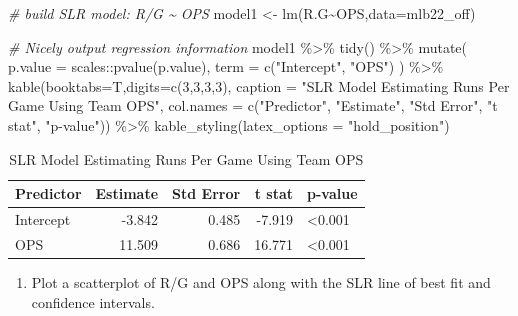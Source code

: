 \documentclass[
  11pt,
]{book}
\newenvironment{Shaded}{\begin{snugshade}}{\end{snugshade}}
\newcommand{\AttributeTok}[1]{\textcolor[rgb]{0.77,0.63,0.00}{#1}}
\newcommand{\CommentTok}[1]{\textcolor[rgb]{0.56,0.35,0.01}{\textit{#1}}}
\newcommand{\DecValTok}[1]{\textcolor[rgb]{0.00,0.00,0.81}{#1}}
\newcommand{\FunctionTok}[1]{\textcolor[rgb]{0.00,0.00,0.00}{#1}}
\newcommand{\NormalTok}[1]{#1}
\newcommand{\OtherTok}[1]{\textcolor[rgb]{0.56,0.35,0.01}{#1}}
\newcommand{\SpecialCharTok}[1]{\textcolor[rgb]{0.00,0.00,0.00}{#1}}
\newcommand{\StringTok}[1]{\textcolor[rgb]{0.31,0.60,0.02}{#1}}
\providecommand{\tightlist}{%
  \setlength{\itemsep}{0pt}\setlength{\parskip}{0pt}}
\theoremstyle{definition}
\theoremstyle{definition}
\theoremstyle{definition}
\theoremstyle{definition}
\theoremstyle{remark}
\begin{document}
\begin{Shaded}
\begin{Highlighting}[]
\CommentTok{\# build SLR model: R/G \textasciitilde{} OPS}
\NormalTok{model1 }\OtherTok{\textless{}{-}} \FunctionTok{lm}\NormalTok{(R.G}\SpecialCharTok{\textasciitilde{}}\NormalTok{OPS,}\AttributeTok{data=}\NormalTok{mlb22\_off)}

\CommentTok{\# Nicely output regression information}
\NormalTok{model1 }\SpecialCharTok{\%\textgreater{}\%} \FunctionTok{tidy}\NormalTok{() }\SpecialCharTok{\%\textgreater{}\%}
  \FunctionTok{mutate}\NormalTok{(}
    \AttributeTok{p.value =}\NormalTok{ scales}\SpecialCharTok{::}\FunctionTok{pvalue}\NormalTok{(p.value),}
    \AttributeTok{term =} \FunctionTok{c}\NormalTok{(}\StringTok{"Intercept"}\NormalTok{, }\StringTok{"OPS"}\NormalTok{)}
\NormalTok{  ) }\SpecialCharTok{\%\textgreater{}\%}
  \FunctionTok{kable}\NormalTok{(}\AttributeTok{booktabs=}\NormalTok{T,}\AttributeTok{digits=}\FunctionTok{c}\NormalTok{(}\DecValTok{3}\NormalTok{,}\DecValTok{3}\NormalTok{,}\DecValTok{3}\NormalTok{,}\DecValTok{3}\NormalTok{), }
        \AttributeTok{caption =} \StringTok{"SLR Model Estimating Runs Per Game Using Team OPS"}\NormalTok{,}
        \AttributeTok{col.names =} \FunctionTok{c}\NormalTok{(}\StringTok{"Predictor"}\NormalTok{, }\StringTok{"Estimate"}\NormalTok{, }\StringTok{"Std Error"}\NormalTok{, }\StringTok{"t stat"}\NormalTok{, }\StringTok{"p{-}value"}\NormalTok{)) }\SpecialCharTok{\%\textgreater{}\%}
  \FunctionTok{kable\_styling}\NormalTok{(}\AttributeTok{latex\_options =} \StringTok{"hold\_position"}\NormalTok{)}
\end{Highlighting}
\end{Shaded}

\begin{table}[!h]

\caption{\label{tab:unnamed-chunk-193}SLR Model Estimating Runs Per Game Using Team OPS}
\centering
\begin{tabular}[t]{lrrrl}
\toprule
Predictor & Estimate & Std Error & t stat & p-value\\
\midrule
Intercept & -3.842 & 0.485 & -7.919 & <0.001\\
OPS & 11.509 & 0.686 & 16.771 & <0.001\\
\bottomrule
\end{tabular}
\end{table}

\newpage

\begin{enumerate}
\def\labelenumi{(\alph{enumi})}
\setcounter{enumi}{3}
\tightlist
\item
  Plot a scatterplot of R/G and OPS along with the SLR line of best fit and confidence intervals.
\end{enumerate}
\end{document}
